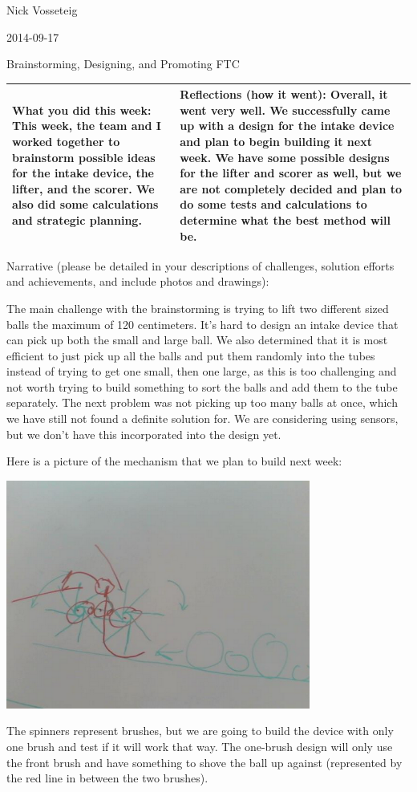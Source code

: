 Nick Vosseteig

2014-09-17

Brainstorming, Designing, and Promoting FTC

\begin{tabular}{|p{5cm}|p{5cm}|}
 \hline
What you did this week:
This week, the team and I worked together to brainstorm possible ideas for the intake device, the lifter, and the scorer. We also did some calculations and strategic planning. &
Reflections (how it went):
Overall, it went very well. We successfully came up with a design for the intake device and plan to begin building it next week. We have some possible designs for the lifter and scorer as well, but we are not completely decided and plan to do some tests and calculations to determine what the best method will be.
 \\
 \hline
\end{tabular}
Narrative (please be detailed in your descriptions of challenges, solution efforts and achievements, and include photos and drawings):

The main challenge with the brainstorming is trying to lift two different sized balls the maximum of 120 centimeters. It’s hard to design an intake device that can pick up both the small and large ball. We also determined that it is most efficient to just pick up all the balls and put them randomly into the tubes instead of trying to get one small, then one large, as this is too challenging and not worth trying to build something to sort the balls and add them to the tube separately. The next problem was not picking up too many balls at once, which we have still not found a definite solution for. We are considering using sensors, but we don’t have this incorporated into the design yet. 

Here is a picture of the mechanism that we plan to build next week:
\begin{center}
 \includegraphics[width=10cm]{./Entries/Images/intake_device.png}
\end{center}
The spinners represent brushes, but we are going to build the device with only one brush and test if it will work that way. The one-brush design will only use the front brush and have something to shove the ball up against (represented by the red line in between the two brushes).
